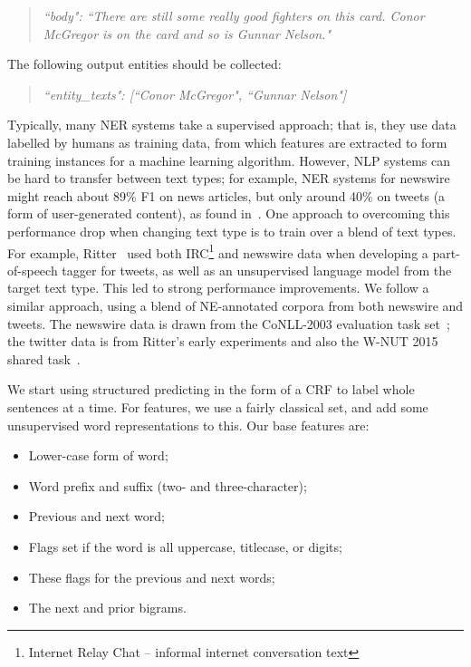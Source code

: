 \documentclass[journal,10pt,draftclsnofoot,onecolumn]{IEEEtran}
\begin{document}
\begin{quote}
\emph{``body": ``There are still some really good fighters on this card. Conor McGregor is on the card and so is Gunnar Nelson."}
\end{quote}

The following output entities should be collected:

\begin{quote}
\emph{``entity\_texts": [``Conor McGregor", ``Gunnar Nelson"]}
\end{quote}

Typically, many NER systems take a supervised approach; that is, they use data labelled by humans as training data, from which features are extracted to form training instances for a machine learning algorithm.
However, NLP systems can be hard to transfer between text types; for example, NER systems for newswire might reach about 89\% F1 on news articles, but only around 40\% on tweets (a form of user-generated content), as found in~\cite{derczynski2015analysis}.
One approach to overcoming this performance drop when changing text type is to train over a blend of text types.
For example, Ritter~\cite{ritter2011named} used both IRC\footnote{Internet Relay Chat -- informal internet conversation text} and newswire data when developing a part-of-speech tagger for tweets, as well as an unsupervised language model from the target text type.
This led to strong performance improvements.
We follow a similar approach, using a blend of NE-annotated corpora from both newswire and tweets.
The newswire data is drawn from the CoNLL-2003 evaluation task set~\cite{tjong2003introduction}; the twitter data is from Ritter's early experiments and also the W-NUT 2015 shared task~\cite{ritter2011named,baldwin2015shared}.

We start using structured predicting in the form of a CRF to label whole sentences at a time.
For features, we use a fairly classical set, and add some unsupervised word representations to this.
Our base features are:

\begin{itemize}
\item Lower-case form of word;
\item Word prefix and suffix (two- and three-character);
\item Previous and next word;
\item Flags set if the word is all uppercase, titlecase, or digits;
\item These flags for the previous and next words;
\item The next and prior bigrams.
\end{itemize}
\end{document}
